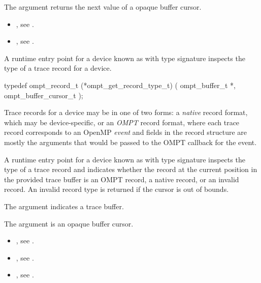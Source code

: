 The argument  returns the next value of a opaque buffer cursor.


\crossreferences
\begin{itemize}
\item {},
see .
\item {},
see .
\end{itemize}

\label{sec:ompt_get_record_type_t}

\summary
A runtime entry point for a device known as
 with type signature
 inspects the type
of a trace record for a device.

\format
\begin{ccppspecific}
\begin{omptInquiry}
typedef ompt_record_t (*ompt_get_record_type_t) (
  ompt_buffer_t *,
  ompt_buffer_cursor_t 
);
\end{omptInquiry}
\end{ccppspecific}

\descr

Trace records for a device may be in one of two forms: a
\emph{native} record format, which may be device-specific,
or an \emph{OMPT} record format, where each trace record
corresponds to an OpenMP \emph{event} and fields in the record
structure are mostly the arguments that would be passed to the
OMPT callback for the event.

A runtime entry point for a device known as
 with type signature
 inspects the type
of a trace record and indicates whether the record at the current
position in the provided trace buffer is an OMPT record,
a native record, or an invalid record. An invalid record type
is returned if the cursor is out of bounds.

\argdesc
The argument  indicates a trace buffer.

The argument  is an opaque buffer cursor.




\crossreferences
\begin{itemize}
\item {},
see .
\item {},
see .
\item {},
see .
\end{itemize}

